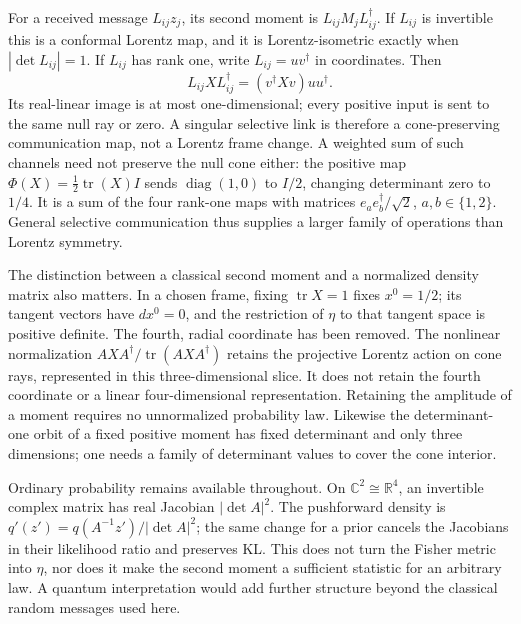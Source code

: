 For a received message $L_{ij}z_j$, its second moment is $L_{ij}M_jL_{ij}^\dagger$. If $L_{ij}$ is invertible this is a conformal Lorentz map, and it is Lorentz-isometric exactly when $|\det L_{ij}|=1$. If $L_{ij}$ has rank one, write $L_{ij}=uv^\dagger$ in coordinates. Then
\begin{equation}
L_{ij}XL_{ij}^\dagger=(v^\dagger Xv)uu^\dagger.
\label{eq:lor-rank-one-channel}
\end{equation}
Its real-linear image is at most one-dimensional; every positive input is sent to the same null ray or zero. A singular selective link is therefore a cone-preserving communication map, not a Lorentz frame change. A weighted sum of such channels need not preserve the null cone either: the positive map $\Phi(X)=\tfrac12\operatorname{tr}(X)I$ sends $\operatorname{diag}(1,0)$ to $I/2$, changing determinant zero to $1/4$. It is a sum of the four rank-one maps with matrices $e_ae_b^\dagger/\sqrt2$, $a,b\in\{1,2\}$. General selective communication thus supplies a larger family of operations than Lorentz symmetry.

The distinction between a classical second moment and a normalized density matrix also matters. In a chosen frame, fixing $\operatorname{tr}X=1$ fixes $x^0=1/2$; its tangent vectors have $dx^0=0$, and the restriction of $\eta$ to that tangent space is positive definite. The fourth, radial coordinate has been removed. The nonlinear normalization $AXA^\dagger/\operatorname{tr}(AXA^\dagger)$ retains the projective Lorentz action on cone rays, represented in this three-dimensional slice. It does not retain the fourth coordinate or a linear four-dimensional representation. Retaining the amplitude of a moment requires no unnormalized probability law. Likewise the determinant-one orbit of a fixed positive moment has fixed determinant and only three dimensions; one needs a family of determinant values to cover the cone interior.

Ordinary probability remains available throughout. On $\mathbb C^2\cong\mathbb R^4$, an invertible complex matrix has real Jacobian $|\det A|^2$. The pushforward density is $q'(z')=q(A^{-1}z')/|\det A|^2$; the same change for a prior cancels the Jacobians in their likelihood ratio and preserves KL. This does not turn the Fisher metric into $\eta$, nor does it make the second moment a sufficient statistic for an arbitrary law. A quantum interpretation would add further structure beyond the classical random messages used here.

